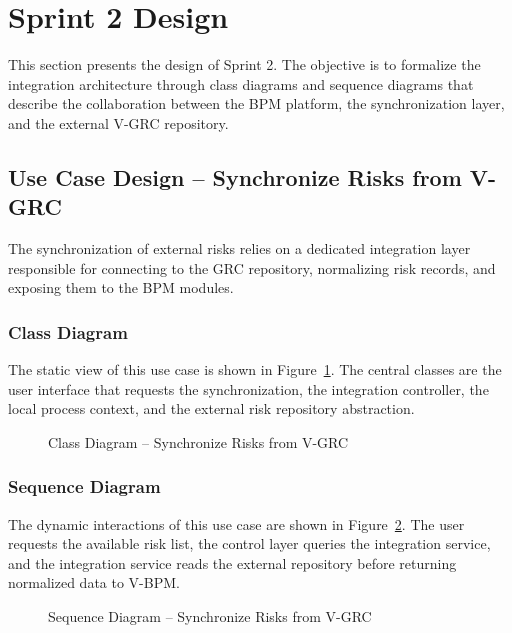 \section{Sprint 2 Design}

This section presents the design of Sprint 2. The objective is to formalize the integration architecture through class diagrams and sequence diagrams that describe the collaboration between the BPM platform, the synchronization layer, and the external V-GRC repository.

\subsection{Use Case Design -- Synchronize Risks from V-GRC}

The synchronization of external risks relies on a dedicated integration layer responsible for connecting to the GRC repository, normalizing risk records, and exposing them to the BPM modules.

\subsubsection{Class Diagram}

The static view of this use case is shown in Figure~\ref{fig:class-grc-fetch}. The central classes are the user interface that requests the synchronization, the integration controller, the local process context, and the external risk repository abstraction.

\begin{figure}[H]
\centering
{}
\caption{Class Diagram -- Synchronize Risks from V-GRC}
\label{fig:class-grc-fetch}
\end{figure}

\subsubsection{Sequence Diagram}

The dynamic interactions of this use case are shown in Figure~\ref{fig:seq-grc-fetch}. The user requests the available risk list, the control layer queries the integration service, and the integration service reads the external repository before returning normalized data to V-BPM.

\begin{figure}[H]
\centering
{}
\caption{Sequence Diagram -- Synchronize Risks from V-GRC}
\label{fig:seq-grc-fetch}
\end{figure}

